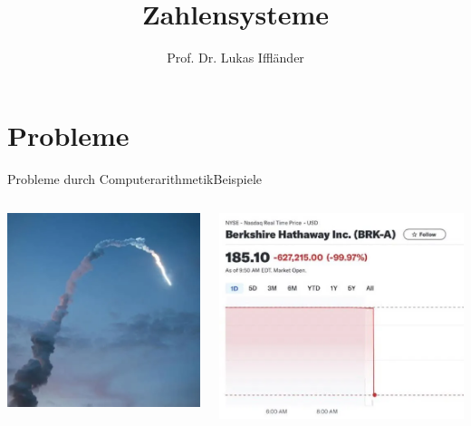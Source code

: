 \documentclass[xelatex,aspectratio=169]{beamer}
\title{Zahlensysteme}
\author{Prof. Dr. Lukas Iffländer}
\institute{HTW Dresden}
\date{}
\begin{document}
\begin{frame}
  \titlepage
\end{frame}

\section{Probleme}

\begin{frame}{Probleme durch Computerarithmetik}{Beispiele}
  \begin{columns}
    \begin{column}{0.5\textwidth}
      \includegraphics[width=\textwidth]{img/ariane_crash.png}
    \end{column}
    \begin{column}{0.5\textwidth}
      \includegraphics[width=\textwidth]{img/berkshire_crash.png}
    \end{column}
  \end{columns}
\end{frame}
\end{document}
